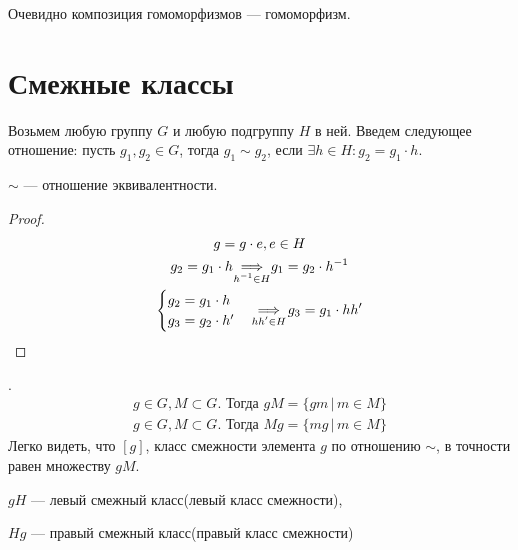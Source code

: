 \documentclass[../main.tex]{subfiles}
\begin{document}
\begin{remark}
    Очевидно композиция гомоморфизмов --- гомоморфизм.
\end{remark}

\section{Смежные классы}
Возьмем любую группу $G$ и любую подгруппу $H$ в ней. Введем следующее отношение: пусть $g_1, g_2 \in G$, тогда $g_1 \sim g_2$, если $\exists h \in H : g_2 = g_1 \cdot h$.

\begin{statement}
    $\sim$ --- отношение эквивалентности.
\end{statement}
\begin{proof}
    \begin{equation*}
        \begin{gathered}
            g = g \cdot e, e \in H\\
            g_2 = g_1 \cdot h \underset{\mathclap{h^{-1} \in H}}{\implies} g_1 = g_2 \cdot h^{-1} \\
            \begin{cases}
                g_2 = g_1 \cdot h \\
                g_3 = g_2 \cdot h'
            \end{cases}
            \underset{\mathclap{hh' \in H}}{\implies}
            g_3 = g_1 \cdot hh'
        \end{gathered}
    \end{equation*}
\end{proof}

.
\begin{equation*}
    \begin{gathered}
        g \in G, M \subset G\text{. Тогда }gM = \{gm \, | \, m \in M\}\\
        g \in G, M \subset G\text{. Тогда }Mg = \{mg \, | \, m \in M\}
    \end{gathered}
\end{equation*}
Легко видеть, что $[g]$, класс смежности элемента $g$ по отношению $\sim$, в точности равен множеству $gM$.

\begin{definition}
    $gH$ --- левый смежный класс(левый класс смежности),

    $Hg$ --- правый смежный класс(правый класс смежности)
\end{definition}
\end{document}
